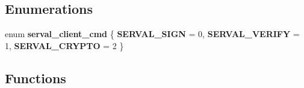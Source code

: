 \subsection*{Enumerations}
\begin{DoxyCompactItemize}
\item 
\hypertarget{serval-client_8c_a0a903cc5971ab1ba9c7d6d25059c844d}{enum {\bfseries serval\+\_\+client\+\_\+cmd} \{ {\bfseries S\+E\+R\+V\+A\+L\+\_\+\+S\+I\+G\+N} = 0, 
{\bfseries S\+E\+R\+V\+A\+L\+\_\+\+V\+E\+R\+I\+F\+Y} = 1, 
{\bfseries S\+E\+R\+V\+A\+L\+\_\+\+C\+R\+Y\+P\+T\+O} = 2
 \}}\label{serval-client_8c_a0a903cc5971ab1ba9c7d6d25059c844d}

\end{DoxyCompactItemize}
\subsection*{Functions}
